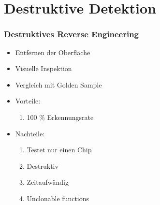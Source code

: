 \documentclass[11pt]{beamer}
\begin{document}
\section{Destruktive Detektion}
\begin{frame}
    \frametitle{Destruktives Reverse Engineering}
    \begin{itemize}
        \item Entfernen der Oberfläche
        \item Visuelle Inspektion
        \item Vergleich mit Golden Sample
        \item Vorteile: 
        \begin{enumerate}
            \item 100 \% Erkennungsrate
        \end{enumerate}
        \item Nachteile:
        \begin{enumerate}
            \item Testet nur einen Chip
            \item Destruktiv
            \item Zeitaufwändig
            \item Unclonable functions
        \end{enumerate}
    \end{itemize}
\end{frame}
\end{document}
